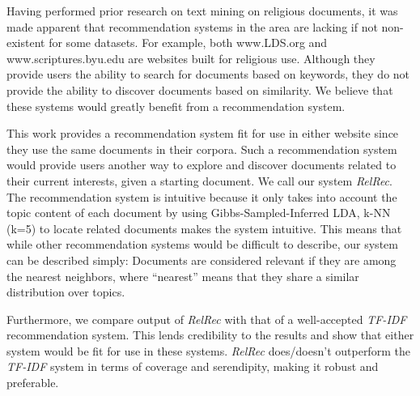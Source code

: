 
Having performed prior research on text mining on religious documents, it was made apparent that recommendation systems in the area are lacking if not non-existent for some datasets. For example, both www.LDS.org and www.scriptures.byu.edu are websites built for religious use. Although they provide users the ability to search for documents based on keywords, they do not provide the ability to discover documents based on similarity. We believe that these systems would greatly benefit from a recommendation system.

This work provides a recommendation system fit for use in either website since they use the same documents in their corpora. Such a recommendation system would provide users another way to explore and discover documents related to their current interests, given a starting document. We call our system \emph{RelRec}. The recommendation system is intuitive because it only takes into account the topic content of each document by using Gibbs-Sampled-Inferred LDA, k-NN (k=5) to locate related documents makes the system intuitive. This means that while other recommendation systems would be difficult to describe, our system can be described simply: Documents are considered relevant if they are among the nearest neighbors, where ``nearest'' means that they share a similar distribution over topics.

Furthermore, we compare output of \emph{RelRec} with that of a well-accepted \emph{TF-IDF} recommendation system. This lends credibility to the results and show that either system would be fit for use in these systems. \emph{RelRec} does/doesn’t outperform the \emph{TF-IDF} system in terms of coverage and serendipity, making it robust and preferable.
